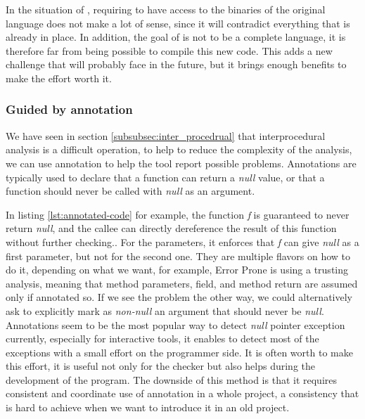 In the situation of \slang{}, requiring to have access to the binaries of the original language does not make a lot of sense, since it will contradict everything that is already in place.
In addition, the goal of \slang{} is not to be a complete language, it is therefore far from being possible to compile this new code. 
This adds a new challenge that \slang{} will probably face in the future, but it brings enough benefits to make the effort worth it.

\subsubsection{Guided by annotation}
\label{subsubsec:guided_by_annotation}

We have seen in section \ref{subsubsec:inter_procedrual} that interprocedural analysis is a difficult operation, to help to reduce the complexity of the analysis, we can use annotation to help the tool report possible problems. 
Annotations are typically used to declare that a function can return a \emph{null} value, or that a function should never be called with \emph{null} as an argument.



In listing \ref{lst:annotated-code} for example, the function \emph{f} is guaranteed to never return \emph{null}, and the callee can directly dereference the result of this function without further checking..
For the parameters, it enforces that \emph{f} can give \emph{null} as a first parameter, but not for the second one.\newline
They are multiple flavors on how to do it, depending on what we want, for example, Error Prone is using a trusting analysis, meaning that method parameters, field, and method return are assumed \nullable{} only if annotated so. 
If we see the problem the other way, we could alternatively ask to explicitly mark as \emph{non-null} an argument that should never be \emph{null}.\newline
Annotations seem to be the most popular way to detect \emph{null} pointer exception currently, especially for interactive tools, it enables to detect most of the exceptions with a small effort on the programmer side. 
It is often worth to make this effort, it is useful not only for the checker but also helps during the development of the program.
The downside of this method is that it requires consistent and coordinate use of annotation in a whole project, a consistency that is hard to achieve when we want to introduce it in an old project.

